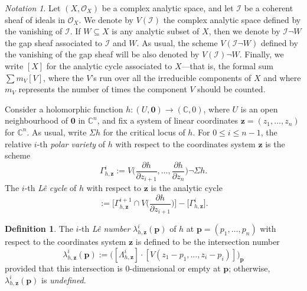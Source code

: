 \documentclass[a4paper,fleqn,11pt]{amsart}
\theoremstyle{definition}
\newtheorem{definition}[theorem]{Definition}
\theoremstyle{remark}
\newtheorem{notation}[theorem]{Notation}
\numberwithin{equation}{section}
\begin{document}
\begin{notation}
Let $(X,\mathscr{O}_X)$ be a complex analytic space, and let $\mathscr{I}$ be a coherent sheaf of ideals in $\mathscr{O}_X$. We denote by $V(\mathscr{I})$ the complex analytic space defined by the vanishing of $\mathscr{I}$. If $W\subseteq X$ is any analytic subset of $X$, then we denote by $\mathscr{I}\lnot W$ the gap sheaf associated to $\mathscr{I}$ and $W$. As usual, the scheme $V(\mathscr{I}\lnot W)$ defined by the vanishing of the gap sheaf will be also denoted by $V(\mathscr{I})\lnot W$. Finally, we write $[X]$ for the analytic cycle associated to $X$---that is, the formal sum $\sum m_V [V]$, where the $V$'s run over all the irreducible components of $X$ and where $m_V$ represents the number of times the component $V$ should be counted.
\end{notation}

Consider a holomorphic function $h\colon (U,\mathbf{0})\rightarrow(\mathbb{C},0)$, where $U$ is an open neighbourhood of $\mathbf{0}$ in $\mathbb{C}^n$, and fix a system of linear coordinates $\mathbf{z}=(z_1,\ldots,z_n)$ for $\mathbb{C}^n$. As usual, write $\Sigma h$ for the critical locus of $h$. For $0\leq i\leq n-1$, the relative $i$-th  \emph{polar variety} of $h$ with respect to the coordinates system $\mathbf{z}$ is the scheme
\begin{equation*}
\Gamma_{h,\mathbf{z}}^i:=V\bigg(\frac{\partial h}{\partial z_{i+1}},\ldots,\frac{\partial h}{\partial z_{n}}\bigg) \lnot \Sigma h.
\end{equation*}
The $i$-th \emph{L\^e cycle} of $h$ with respect to $\mathbf{z}$ is the analytic cycle
\begin{equation*}
[\Lambda^i_{h,\mathbf{z}}]:=\bigg[\Gamma_{h,\mathbf{z}}^{i+1}\cap V\bigg(\frac{\partial h}{\partial z_{i+1}}\bigg)\bigg] - \bigg[\Gamma_{h,\mathbf{z}}^i\bigg].
\end{equation*}

\begin{definition}
The $i$-th \emph{L\^e number} $\lambda^i_{h,\mathbf{z}}(\mathbf{p})$ of $h$ at $\mathbf{p}=(p_1,\ldots,p_n)$ with respect to the coordinates system $\mathbf{z}$ is defined to be the intersection number
\begin{equation}\label{dln}
\lambda^i_{h,\mathbf{z}}(\mathbf{p}):=\big([\Lambda^i_{h,\mathbf{z}}]\cdot [V(z_1-p_1,\ldots,z_i-p_i)]\big)_\mathbf{p}
\end{equation}
provided that this intersection is $0$-dimensional or empty at $\mathbf{p}$; otherwise, $\lambda^i_{h,\mathbf{z}}(\mathbf{p})$ is \emph{undefined}.
\end{definition}
\end{document}

